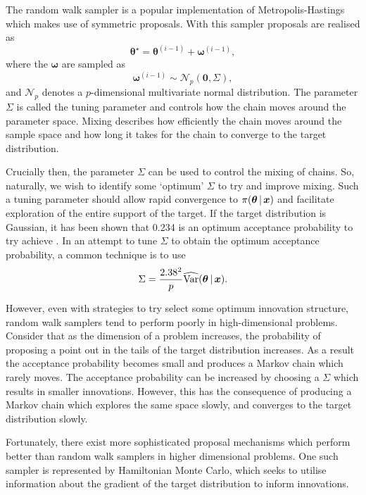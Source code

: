 The random walk sampler is a popular implementation of Metropolis-Hastings which makes
use of symmetric proposals. With this sampler proposals are realised as
\begin{equation*}
  \bm{\theta}^\star = \bm{\theta}^{(i-1)} + \bm{\omega}^{(i-1)},
\end{equation*}
where the $\bm{\omega}$ are sampled as
\begin{equation*}
  \bm{\omega}^{(i-1)} \sim \mathcal{N}_p(\bm{0}, \Sigma),
\end{equation*}
and $\mathcal{N}_p$ denotes a $p$-dimensional multivariate normal distribution. The
parameter $\Sigma$ is called the tuning parameter and controls how the chain moves around
the parameter space. Mixing describes how efficiently the chain moves around the sample
space and how long it takes for the chain to converge to the target distribution.

Crucially then, the parameter $\Sigma$ can be used to control the mixing of chains. So,
naturally, we wish to identify some `optimum' $\Sigma$ to try and improve mixing. Such a
tuning parameter should allow rapid convergence to $\pi(\bm{\theta} \,|\, \bm{x})$ and
facilitate exploration of the entire support of the target. If the target distribution is
Gaussian, it has been shown that 0.234 is an optimum acceptance probability to try achieve
\parencite{roberts01}. In an attempt to tune $\Sigma$ to obtain the optimum acceptance
probability, a common technique is to use
\begin{equation*}
  \Sigma = \frac{2.38^2}{p} \widehat{\text{Var}}(\bm{\theta} \,|\, \bm{x}).
\end{equation*}

However, even with strategies to try select some optimum innovation structure, random walk
samplers tend to perform poorly in high-dimensional problems. Consider that as the
dimension of a problem increases, the probability of proposing a point out in the tails of
the target distribution increases. As a result the acceptance probability becomes small and
produces a Markov chain which rarely moves. The acceptance probability can be increased
by choosing a $\Sigma$ which results in smaller innovations. However, this has the
consequence of producing a Markov chain which explores the same space slowly, and
converges to the target distribution slowly.

Fortunately, there exist more sophisticated proposal mechanisms which perform better than
random walk samplers in higher dimensional problems. One such sampler is represented by
Hamiltonian Monte Carlo, which seeks to utilise information about the gradient of the
target distribution to inform innovations.

